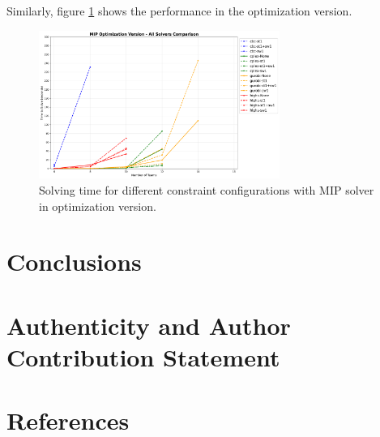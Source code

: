 \documentclass{article}
\begin{document}
Similarly, figure \ref{fig:MIP_opt} shows the performance in the optimization version.

\begin{figure}[H]
    \centering
    \includegraphics[width=0.7\textwidth]{../plots/MIP_optimization.png}
    \caption{Solving time for different constraint configurations with MIP solver in optimization version.}
    \label{fig:MIP_opt}
\end{figure}

\section{Conclusions}

\section{Authenticity and Author Contribution Statement}

\section{References}
\end{document}
